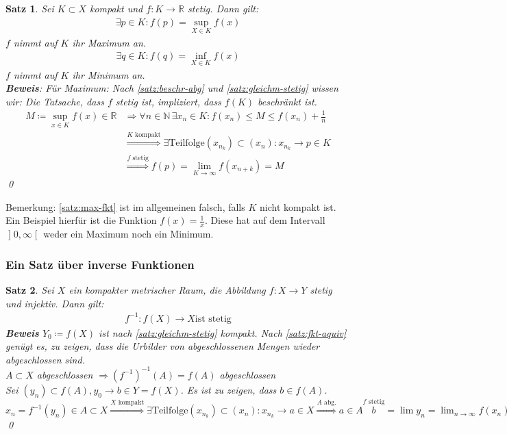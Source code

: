 \documentclass[ngerman,titlepage,twoside, parskip=half*]{scrreprt}
\newcommand*{\N}{\mathbb{N}}
\newcommand*{\R}{\mathbb{R}}
\theoremstyle{break}
\newtheorem{theorem}{Satz}[section]
\theoremstyle{nonumberbreak}
\newcommand*{\bsofint}[1]{\mathopen{]}#1\mathclose{[}} %
\begin{document}
\begin{theorem}
\label{satz:max-fkt}
Sei $K\subset X$ kompakt und $f\colon K\rightarrow\R$ stetig. Dann gilt:
\begin{gather*}\exists p \in K\colon f(p)=\sup_{X\in K}f(x)\end{gather*}
$f$ nimmt auf $K$ ihr Maximum an.
\begin{gather*}\exists q \in K\colon f(q)=\inf_{X\in K}f(x)\end{gather*}
$f$ nimmt auf $K$ ihr Minimum an.\\
\textbf{Beweis}: Für Maximum: Nach \autoref{satz:beschr-abg} und \autoref{satz:gleichm-stetig} wissen wir: Die Tatsache, dass
$f$ stetig ist, impliziert, dass $f(K)$ beschränkt ist.
\begin{align*}
  M\coloneqq\sup_{x\in K} f(x)\in\R & \Rightarrow \forall n \in \N\,\exists x_n\in K\colon f(x_n)\leq M\leq f(x_n)+\frac{1}{n}\\
  & \stackrel{K\text{~kompakt}}{\Rightarrow} \exists \text{Teilfolge} (x_{n_k})\subset (x_n)\colon x_{n_k}\rightarrow p\in K\\
  & \stackrel{f\text{~stetig}}{\Rightarrow} f(p)=\lim_{K\rightarrow \infty} f(x_{n+k})=M
\end{align*}
\qed
\end{theorem}

Bemerkung: \autoref{satz:max-fkt} ist im allgemeinen falsch, falls $K$ nicht kompakt ist. Ein Beispiel hierfür ist
die Funktion $f(x)=\frac{1}{x}$. Diese hat auf dem Intervall $\bsofint{0,\infty}$ weder ein Maximum noch ein Minimum.

\subsubsection{Ein Satz über inverse Funktionen}
\begin{theorem}
\label{satz:invFunkt}
Sei $X$ ein kompakter metrischer Raum, die Abbildung $f\colon X\rightarrow Y$ stetig und injektiv. Dann gilt:
\begin{gather*}f^{-1}\colon f(X)\rightarrow X\text{ist stetig}\end{gather*}
\textbf{Beweis} $Y_0 \coloneqq f(X)$ ist nach \autoref{satz:gleichm-stetig} kompakt. Nach \autoref{satz:fkt-aquiv} genügt es,
zu zeigen, dass die Urbilder von abgeschlossenen Mengen wieder abgeschlossen sind.\\
$A\subset X$ abgeschlossen $\Rightarrow (f^{-1})^{-1}(A)=f(A)$ abgeschlossen\\
Sei $(y_n)\subset f(A), y_0\rightarrow b\in Y=f(X)$. Es ist zu zeigen, dass $b\in f(A)$.\\
$x_n=f^{-1}(y_n)\in A\subset X\stackrel{X\text{~kompakt}}{\Rightarrow} \exists \text{Teilfolge}(x_{n_k})\subset (x_n)
\colon x_{n_k}\rightarrow a\in X\stackrel{A\text{~abg.}}{\Rightarrow} a\in A\stackrel{f\text{~stetig}} b=\lim y_n=
\lim_{n\rightarrow\infty}f(x_n)=\lim_{k\rightarrow\infty}f(x_{n_k})=f(a)\in f(A)$
\qed
\end{theorem}
\end{document}
